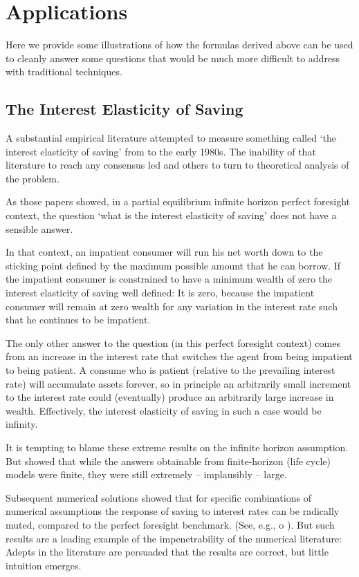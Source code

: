 \documentclass[titlepage,abstract]{\econtex}\newcommand{\texname}{ctDiscrete}
\begin{document}
\section{Applications}

Here we provide some illustrations of how the formulas derived above can be used 
to cleanly answer some questions that would be much more difficult to address 
with traditional techniques.

\subsection{The Interest Elasticity of Saving}

A substantial empirical literature attempted to measure something called `the interest
elasticity of saving' from \cite{wrightInterestElasticity} to
the early 1980s.  The inability of that literature to reach any
consensus led \cite{summersCapTax} and others to turn to theoretical
analysis of the problem.

As those papers showed, in a partial equilibrium infinite horizon
perfect foresight context, the question `what is the interest elasticity of saving' does not have a sensible answer.

In that context, an impatient consumer will run his net worth down to
the sticking point defined by the maximum possible amount that he can
borrow.  If the impatient consumer is constrained to have a
minimum wealth of zero the interest elasticity of saving well
defined: It is zero, because the impatient consumer will remain at
zero wealth for any variation in the interest rate such that he
continues to be impatient.

The only other answer to the question (in this perfect
foresight context) comes from an increase in the interest rate that
switches the agent from being impatient to being patient.  A consume
who is patient (relative to the prevailing interest rate) will
accumulate assets forever, so in principle an arbitrarily small
increment to the interest rate could (eventually) produce an
arbitrarily large increase in wealth.  Effectively, the interest
elasticity of saving in such a case would be infinity.

It is tempting to blame these extreme results on the infinite horizon
assumption.  But \cite{summersCapTax} showed that while the answers
obtainable from finite-horizon (life cycle) models were finite, 
they were still extremely -- implausibly -- large.  

Subsequent numerical solutions showed that for specific combinations
of numerical assumptions the response of saving to interest rates can
be radically muted, compared to the perfect foresight benchmark.
(See, e.g., \cite{carroll:bslcpih} o
\cite{cagettiInterestElasticity}).  But such results are a leading
example of the impenetrability of the numerical literature: Adepts in
the literature are persuaded that the results are correct, but little
intuition emerges.  
\end{document}
